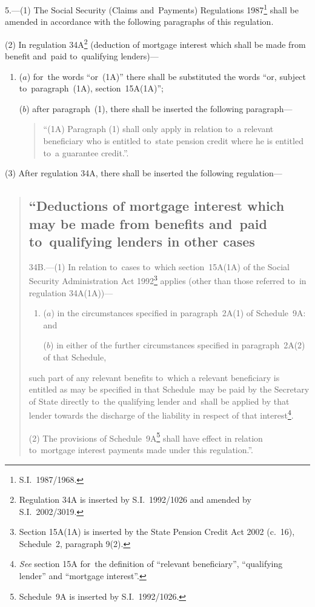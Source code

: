 \documentclass[12pt,a4paper]{article}
\begin{document}
5.---(1)  The Social Security (Claims and~Payments) Regulations 1987\footnote{S.I.~1987/1968.} shall be amended in accordance with the following paragraphs of this regulation.

(2) In regulation 34A\footnote{Regulation 34A is inserted by S.I.~1992/1026 and amended by S.I.~2002/3019.} (deduction of mortgage interest which shall be made from benefit and~paid to~qualifying lenders)—
\begin{enumerate}\item[]
($a$) for~the words “or~(1A)” there shall be substituted the words “or, subject to~paragraph~(1A), section~15A(1A)”;

($b$) after paragraph~(1), there shall be inserted the following paragraph—
\begin{quotation}
“(1A) Paragraph (1) shall only apply in relation to~a relevant beneficiary who is entitled to~state pension credit where he is entitled to~a guarantee credit.”.
\end{quotation}
\end{enumerate}

(3) After regulation 34A, there shall be inserted the following regulation—
\begin{quotation}
\subsection*{“Deductions of mortgage interest which may be made from benefits and~paid to~qualifying lenders in other cases}

34B.---(1)  In relation to~cases to~which section~15A(1A) of the Social Security Administration Act 1992\footnote{Section 15A(1A) is inserted by the State Pension Credit Act 2002 (c.~16), Schedule~2, paragraph 9(2).} applies (other than those referred to~in regulation 34A(1A))—
\begin{enumerate}\item[]
($a$) in the circumstances specified in paragraph~2A(1) of Schedule~9A: and

($b$) in either of the further circumstances specified in paragraph~2A(2) of that Schedule,
\end{enumerate}
such part of any relevant benefits to~which a relevant beneficiary is entitled as may be specified in that Schedule~may be paid by the Secretary of State directly to~the qualifying lender and~shall be applied by that lender towards the discharge of the liability in respect of that interest\footnote{\emph{See} section 15A for~the definition of “relevant beneficiary”, “qualifying lender” and “mortgage interest”.}.

(2) The provisions of Schedule~9A\footnote{Schedule~9A is inserted by S.I.~1992/1026.} shall have effect in relation to~mortgage interest payments made under this regulation.”.
\end{quotation}
\end{document}
